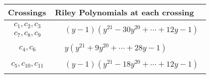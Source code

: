\documentclass[1p]{elsarticle_modified}
\theoremstyle{definition}
\begin{document}
\begin{tabular}{m{50pt}|m{274pt}}
Crossings & \hspace{64pt}Riley Polynomials at each crossing \\
\hline $$\begin{aligned}c_{1},c_{2},c_{3}\\c_{7},c_{8},c_{9}\end{aligned}$$&$\begin{aligned}
&(y-1)(y^{21}-30 y^{20}+\cdots+12 y-1)
\end{aligned}$\\
\hline $$\begin{aligned}c_{4},c_{6}\end{aligned}$$&$\begin{aligned}
&y(y^{21}+9 y^{20}+\cdots+28 y-1)
\end{aligned}$\\
\hline $$\begin{aligned}c_{5},c_{10},c_{11}\end{aligned}$$&$\begin{aligned}
&(y-1)(y^{21}-18 y^{20}+\cdots+12 y-1)
\end{aligned}$\\
\hline
\end{tabular}
\vskip 2pc
\end{document}
